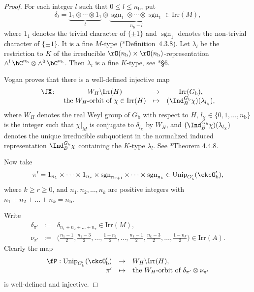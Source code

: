 \documentclass[12pt,a4paper]{amsart}
\newcommand{\cusp}{{\mathrm{cusp}}}
\newcommand{\sgn}{\operatorname{sgn}}
\numberwithin{equation}{section}
\theoremstyle{remark}
\def\Irr{\mathrm{Irr}}
\def\Unip{\mathrm{Unip}}
\def\ckcOpb{\ckcO'_{\mathrm b}}
\def\nnb{n_{\mathrm b}}
\def\Gb{G_{\mathrm b}}
\def\Gpb{G'_{\mathrm b}}
\begin{document}
\begin{proof}
 For each integer $l$ such that $0\leq l \leq \nnb$, put
    \[
      \delta_{l} = \underbrace{1_{1}\otimes \cdots \otimes 1_{1}}_{l} \otimes
      \underbrace{\sgn_{1} \otimes \cdots \otimes \sgn_{1}}_{\nnb-l}\in \Irr(M),
    \]
    where $1_{1}$ denotes the trivial character of $\{\pm 1\}$ and $\sgn_{1}$ denotes the non-trivial character of $\{\pm 1\}$.
It is a fine $M$-type (\cite{Vg}*{Definition~4.3.8}). Let $\lambda_{l}$ be
    the restriction to $K$ of the irreducible
    $\rO(\nnb)\times \rO(\nnb)$-representation
    $\wedge^{l}\,\bC^{\nnb}\otimes \wedge^{0}\,\bC^{\nnb}$. Then $\lambda_{l}$ is a
    fine $K$-type, see \cite{BGG.M}*{\S 6}.

    \def\cusp{\fC}

    Vogan proves that there is a well-defined injective map
\[
      \begin{array}{lccc}
       \fX\colon &   W_H\backslash \Irr(H)&\rightarrow & \Irr(G_\mathrm b),\\
       & \textrm{the $W_H$-orbit of $\chi\in \Irr(H)$} & \mapsto & (\Ind_{B}^{\Gb}\chi)(\lambda_{l_\chi}),
      \end{array}
    \]
    where $W_H$ denotes the real Weyl group of $G_\mathrm b$ with respect to $H$,  $l_\chi\in\{0,1, \dots, n_\mathrm b\}$ is the integer such that $\chi|_M$ is conjugate to $\delta_{l_\chi}$ by $W_H$, and $(\Ind_{B}^{\Gb}\chi)(\lambda_{l_\chi})$ denotes the unique
    irreducible subquotient in the normalized induced representation
    $\Ind_{B}^{\Gb}\chi$ containing the $K$-type $\lambda_{l}$. See \cite{Vg}*{Theorem 4.4.8}.

        Now take
         \[
         \pi' = 1_{n_{1}}\times \cdots \times 1_{n_{r}}\times \sgn_{n_{r+1}}\times \cdots \times \sgn_{n_{k}}\in \Unip_{\Gpb}(\ckcOpb),
         \]
       where   $k\geq r\geq 0$,  and $n_1, n_2, \dots, n_k$ are positive integers with  $n_1+n_2+ \dots+ n_k=\nnb$.



    Write
    \begin{eqnarray*}
    \delta_{\pi'}&:=&\delta_{n_{1}+n_{2}+\dots + n_{r}}\in \Irr(M),\\
        \nu_{\pi'} &:=& \big( {\tfrac{n_{1}-1}{2},\tfrac{n_{1}-3}{2},\dots ,\tfrac{1-n_{1}}{2}, \dots , \tfrac{n_{k}-1}{2},\tfrac{n_{k}-3}{2},\dots ,\tfrac{1-n_{k}}{2}} \big)\in \Irr(A).
   \end{eqnarray*}
   Clearly the map
   \[
   \begin{array}{rcl}
     \fP:   \Unip_{\Gpb}(\ckcOpb)&\rightarrow &  W_H\backslash \Irr(H),\\
      \pi' &\mapsto & \textrm{the $W_H$-orbit of $\delta_{\pi'}\otimes \nu_{\pi'}$}
      \end{array}
      \]
       is well-defined and
    injective.


\end{proof}
\end{document}
